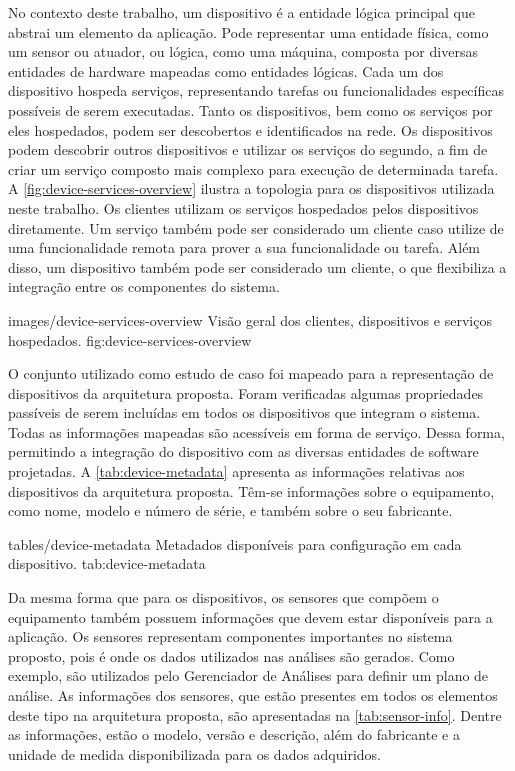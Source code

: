 No contexto deste trabalho, um dispositivo é a entidade lógica principal que abstrai um elemento da
aplicação. Pode representar uma entidade física, como um sensor ou atuador, ou lógica, como uma
máquina, composta por diversas entidades de hardware mapeadas como entidades lógicas. Cada um dos
dispositivo hospeda serviços, representando tarefas ou funcionalidades específicas possíveis de
serem executadas. Tanto os dispositivos, bem como os serviços por eles hospedados, podem ser
descobertos e identificados na rede. Os dispositivos podem descobrir outros dispositivos e utilizar
os serviços do segundo, a fim de criar um serviço composto mais complexo para execução de
determinada tarefa. A \cref{fig:device-services-overview} ilustra a topologia para os dispositivos
utilizada neste trabalho. Os clientes utilizam os serviços hospedados pelos dispositivos
diretamente. Um serviço também pode ser considerado um cliente caso utilize de uma funcionalidade
remota para prover a sua funcionalidade ou tarefa. Além disso, um dispositivo também pode ser
considerado um cliente, o que flexibiliza a integração entre os componentes do sistema.

    {images/device-services-overview}
    {Visão geral dos clientes, dispositivos e serviços hospedados.}
    {fig:device-services-overview}

O conjunto utilizado como estudo de caso foi mapeado para a representação de dispositivos da
arquitetura proposta. Foram verificadas algumas propriedades passíveis de serem incluídas em todos
os dispositivos que integram o sistema. Todas as informações mapeadas são acessíveis em forma de
serviço. Dessa forma, permitindo a integração do dispositivo com as diversas entidades de software
projetadas. A \cref{tab:device-metadata} apresenta as informações relativas aos dispositivos da
arquitetura proposta. Têm-se informações sobre o equipamento, como nome, modelo e número de série, e
também sobre o seu fabricante.

  {tables/device-metadata}
  {Metadados disponíveis para configuração em cada dispositivo.}
  {tab:device-metadata}

Da mesma forma que para os dispositivos, os sensores que compõem o equipamento também possuem
informações que devem estar disponíveis para a aplicação. Os sensores representam componentes
importantes no sistema proposto, pois é onde os dados utilizados nas análises são gerados. Como
exemplo, são utilizados pelo Gerenciador de Análises para definir um plano de análise. As
informações dos sensores, que estão presentes em todos os elementos deste tipo na arquitetura
proposta, são apresentadas na \cref{tab:sensor-info}. Dentre as informações, estão o modelo, versão
e descrição, além do fabricante e a unidade de medida disponibilizada para os dados adquiridos.

